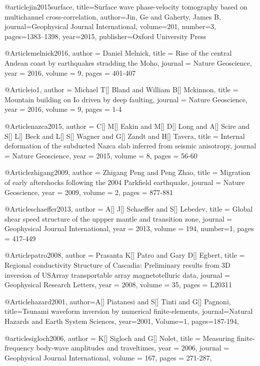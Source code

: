 @article{jin2015surface,
  title={Surface wave phase-velocity tomography based on multichannel cross-correlation},
  author={Jin, Ge and Gaherty, James B},
  journal={Geophysical Journal International},
  volume={201},
  number={3},
  pages={1383--1398},
  year={2015},
  publisher={Oxford University Press}
}

@Article{melnick2016,
  author = 	 {Daniel Melnick},
  title = 	 {Rise of the central Andean coast by earthquakes stradding the Moho},
  journal = 	 {Nature Geoscience},
  year = 	 2016,
  volume = 9,
  pages =	 {401-407}
}

@Article{io1,
  author = 	 {Michael T[] Bland and William B[] Mckinnon},
  title = 	 {Mountain building on {I}o driven by deep faulting},
  journal = 	 {Nature Geoscience},
  year = 	 2016,
  volume = 9,
  pages =	 {1-4}
}


@Article{nazca2015,
  author = 	 {C[] M[] Eakin and M[] D[] Long and A[] Scire and S[] L[] Beck and L[] S[] Wagner and G[] Zandt and H[] Tavera},
  title = 	 {Internal deformation of the subducted Nazca slab inferred from seismic anisotropy},
  journal = 	 {Nature Geoscience},
  year = 	 2015,
  volume = 8,
  pages =	 {56-60}
}

@Article{zhigang2009,
  author = 	 {Zhigang Peng and Peng Zhao},
  title = 	 {Migration of early aftershocks following the 2004 Parkfield earthquake},
  journal = 	 {Nature Geoscience},
  year = 	 2009,
  volume = 2,
  pages =	 {877-881}
}

@Article{schaeffer2013,
  author = 	 {A[] J[] Schaeffer and S[] Lebedev},
  title = 	 {Global shear speed structure of the uppper mantle and transition zone},
  journal = 	 {Geophysical Journal International},
  year = 	 2013,
  volume = 194,
  number=1,
  pages =	 {417-449}
}

@Article{patro2008,
  author = 	 {Prasanta K[] Patro and Gary D[] Egbert},
  title = 	 {Regional conductivity Structure of Cascadia: Preliminary results from 3D inversion of USArray transportable array magnetotelluric data},
  journal = 	 {Geophysical Research Letters},
  year = 	 2008,
  volume = 35,
  pages =	 {L20311}
}

@Article{hazard2001,
  author={A[] Piatanesi and S[] Tinti and G[] Pagnoni},
  title={Tsunami waveform inversion by numerical finite-elements},
  journal={Natural Hazards and Earth System Sciences},
  year=2001,
  Volume=1,
  pages={187-194},
}

@article{sigloch2006,
author = {K[] Sigloch and G[] Nolet},
title = {Measuring finite-frequency body-wave amplitudes and traveltimes},
year = {2006},
journal = {Geophysical Journal International},
volume = {167},
pages = {271-287},
}

